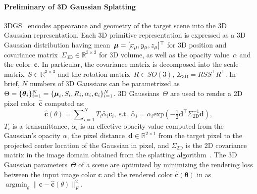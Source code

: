 \label{sec:preliminary}

\paragraph{Preliminary of 3D Gaussian Splatting}
3DGS~\cite{3dgs} encodes appearance and geometry of the target scene into the 3D Gaussian representation. Each 3D primitive representation is expressed as a 3D Gaussian distribution having mean~${\mbox{\boldmath $\mu$}}=[x_\mu, y_\mu, z_\mu]^\top$ for 3D position and covariance matrix~$\Sigma_\text{3D} \in \mathbb{R}^{3\times 3}$ for 3D volume, as well as the opacity value~$\alpha$ and the color~$\mathbf{c}$. In particular, the covariance matrix is decomposed into the scale matrix~$S \in \mathbb{R}^{3\times3}$ and the rotation matrix~$R \in SO(3)$,
$\Sigma_\text{3D} = R S S^\top R^\top$.
In brief, $N$ numbers of 3D Gaussians can be parametrized as~$\Theta = \{ \mbox{\boldmath $\theta$}_i \}_{i=1}^N = \{ \mbox{\boldmath $\mu$}_i, S_i, R_i, \alpha_i, \mathbf{c}_i \}_{i=1}^N$.
3D Gaussians~$\Theta$ are used to render a 2D pixel color~$\hat{\mathbf{c}}$ computed as:
\begin{equation}
\label{eq:vol_render_in_3dgs}
    \hat{\mathbf{c}}(\theta) {=} \sum\nolimits_{i=1}^{N} \!\!T_i\tilde{\alpha_i}\mathbf{c}_i,~\textrm{s.t.}~~\tilde{\alpha_i} {=} \alpha_i \mathrm{exp}\left({ - \tfrac{1}{2}  \mathbf{d}^\top \Sigma_\text{2D}^{-1} \mathbf{d} }\right) ,
\end{equation}
$T_i$ is a transmittance, $\tilde{\alpha_i}$ is an effective opacity value computed from the Gaussian's opacity 
$\alpha$, the pixel distance~$\mathbf{d} \in \mathbb{R}^{2\times 1}$ from the target pixel to the projected center location of the Gaussian in pixel, and $\Sigma_\text{2D}$ is the 2D covariance matrix in the image domain obtained from the splatting algorithm~\cite{3dgs,ewa}. The 3D Gaussian parameters~$\Theta$ of a scene are optimized by minimizing the rendering loss between the input image color $\mathbf{{c}}$ and the rendered color $\mathbf{\hat{c}(\theta)}$ in  as $\mathop{\arg\min}_{\theta} \| \mathbf{{c}} - \mathbf{\hat{c}}(\theta) \|_F^2$.

